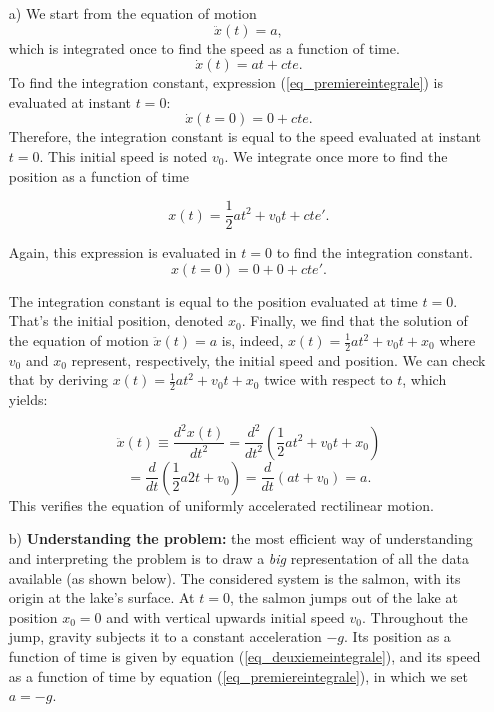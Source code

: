 %
%

\begin{center}
\vspace*{5mm}
\end{center}


\begin{enumerate}
\item[a) ] 
We start from the equation of motion
\[
\ddot{x}(t) =  a,
\] 
which is integrated once to find the speed as a function of time.
\begin{equation}
\dot{x}(t) = at + cte.
\label{eq_premiereintegrale}
\end{equation}
To find the integration constant, expression (\ref{eq_premiereintegrale}) is evaluated at instant $t=0$: 
\[
\dot{x}(t=0) = 0 + cte. 
\]
Therefore, the integration constant is equal to the speed evaluated at instant $t=0$. This initial speed is noted $v_0$. We integrate once more to find the position as a function of time

\begin{equation}
x(t) = \frac{1}{2}at^2 + v_0 t + cte'.
\label{eq_deuxiemeintegrale}
\end{equation}

Again, this expression is evaluated in $t=0$ to find the integration constant.
\[
x(t=0) = 0 + 0 + cte'.
\]

The integration constant is equal to the position evaluated at time $t=0$. That's the initial position, denoted $x_0$. Finally, we find that the solution of the equation of motion $\ddot{x}(t) =  a$ is, indeed, $x(t) = \frac{1}{2}at^2 + v_0 t + x_0$ where $v_0$ and $x_0$ represent, respectively, the initial speed and position.
We can check that by deriving $x(t)=\frac{1}{2}at^2+v_0t+x_0$ twice with respect to $t$, which yields:

\[
\ddot{x}(t) \equiv \frac{d^2x(t)}{dt^2} = \frac{d^2}{dt^2}\left(\frac{1}{2}at^2+v_0t+x_0\right)
\]
\[
= \frac{d}{dt}\left(\frac{1}{2}a2t+v_0\right) = \frac{d}{dt}\left(at+v_0\right) = a.  
\]
This verifies the equation of uniformly accelerated rectilinear motion.


\item[b) ] \textbf{Understanding the problem:} the most efficient way of understanding and interpreting the problem is to draw a \emph{big} representation of all the data available (as shown below). The considered system is the salmon, with its origin at the lake's surface. At $t=0$, the salmon jumps out of the lake at position $x_0=0$ and with vertical upwards initial speed $v_0$. Throughout the jump, gravity subjects it to a constant acceleration $-g$. Its position as a function of time is given by equation (\ref{eq_deuxiemeintegrale}), and its speed as a function of time by equation (\ref{eq_premiereintegrale}), in which we set $a=-g$.


\end{enumerate}
